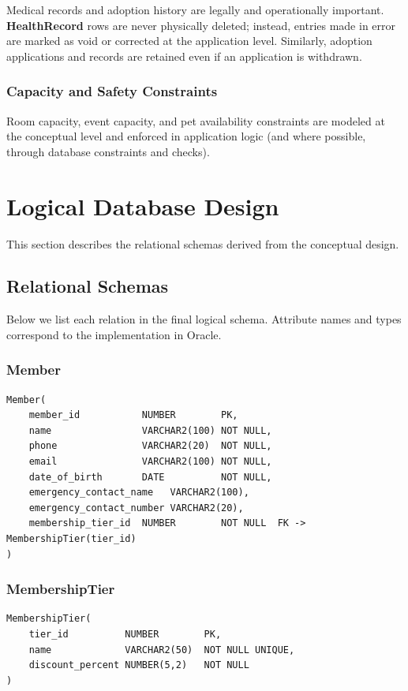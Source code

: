 \documentclass[11pt]{article}
\begin{document}
Medical records and adoption history are legally and operationally important.
\textbf{HealthRecord} rows are never physically deleted; instead, entries made in error
are marked as void or corrected at the application level. Similarly, adoption
applications and records are retained even if an application is withdrawn.

\subsubsection{Capacity and Safety Constraints}

Room capacity, event capacity, and pet availability constraints are modeled
at the conceptual level and enforced in application logic (and where possible,
through database constraints and checks).

\newpage

\section{Logical Database Design}

This section describes the relational schemas derived from the conceptual design.

\subsection{Relational Schemas}

Below we list each relation in the final logical schema. Attribute names and
types correspond to the implementation in Oracle.

\subsubsection*{Member}
\begin{verbatim}
Member(
    member_id           NUMBER        PK,
    name                VARCHAR2(100) NOT NULL,
    phone               VARCHAR2(20)  NOT NULL,
    email               VARCHAR2(100) NOT NULL,
    date_of_birth       DATE          NOT NULL,
    emergency_contact_name   VARCHAR2(100),
    emergency_contact_number VARCHAR2(20),
    membership_tier_id  NUMBER        NOT NULL  FK -> MembershipTier(tier_id)
)
\end{verbatim}

\subsubsection*{MembershipTier}
\begin{verbatim}
MembershipTier(
    tier_id          NUMBER        PK,
    name             VARCHAR2(50)  NOT NULL UNIQUE,
    discount_percent NUMBER(5,2)   NOT NULL
)
\end{verbatim}
\end{document}
